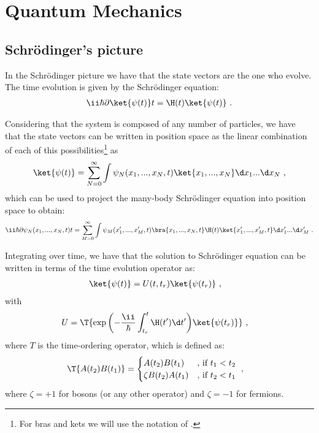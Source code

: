 \documentclass[lettersize, 11pt, tikz]{report}
\begin{document}
\chapter{Quantum Mechanics}


\section{Schrödinger's picture}

In the Schrödinger picture we have that the state vectors are the one who evolve.  The time evolution is given by the Schrödinger equation:
\begin{align}
    \label{eq:abstract-schrodinger}
    \ii \hbar \partial{\ket{\psi(t)}}{t} = \H(t) \ket{\psi(t)}
    \text{ .}
\end{align}

\newpar
Considering that the system is composed of any number of particles, we have that the state vectors can be written in position space as the linear combination of each of this possibilities\footnote{For bras and kets we will use the notation of \cite{negele2018quantum}.} as
\begin{align}
    \label{eq:N-body-state}
    \ket{\psi(t)} = \sum_{N=0}^\infty \int \psi_N(x_1,...,x_N,t) \ket{x_1,...,x_N} \d x_1 ... \d x_N
    \text{ ,}
\end{align}
which can be used to project the many-body Schrödinger equation into position space to obtain:
\begin{align}
    \label{eq:many-body-state}
    \ii \hbar \partial{\psi_N(x_1,...,x_N, t)}{t} =
        \sum_{M=0}^\infty \int \psi_M(x_1',...,x_M',t) \bra{x_1,...,x_N,t} \H(t) \ket{x_1',...,x_M',t} \d x_1' ... \d x_M'
    \text{ .}
\end{align}

\newpar
Integrating over time, we have that the solution to Schrödinger equation can be written in terms of the time evolution operator as:
\begin{align}
    \label{eq:schrodinger-time-evolution}
    \ket{\psi(t)} &= U(t,t_r) \ket{\psi(t_r)}
    \text{ ,}
\end{align}
with
\begin{align}
    \label{eq:time-evolution-definition}
    U &= \T{ \exp\bigg({-\frac{\ii}{\hbar} \int_{t_r}^t \H(t') \d t'}\bigg) \ket{\psi(t_r)} }
    \text{ ,}
\end{align}
where $T$ is the time-ordering operator, which is defined as:
\begin{align}
    \label{eq:time-ordering-definition}
    \T{ A(t_2) B(t_1) } &= \begin{cases}
        A(t_2) B(t_1)       & \text{, if } t_1 < t_2  \\
        \zeta B(t_2) A(t_1) & \text{, if } t_2 < t_1
    \end{cases}
    \text{ ,}
\end{align}
where $\zeta = +1$ for bosons (or any other operator) and $\zeta = -1$ for fermions.
\end{document}
